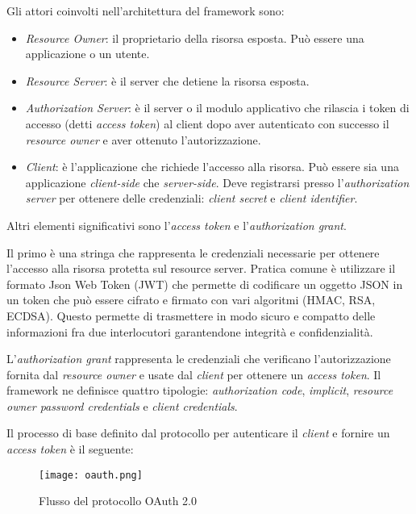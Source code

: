 Gli attori coinvolti nell'architettura del framework sono:
\begin{itemize}
    \item \textit{Resource Owner}: il proprietario della risorsa esposta. Può essere una applicazione o un utente.
    \item \textit{Resource Server}: è il server che detiene la risorsa esposta.
    \item \textit{Authorization Server}: è il server o il modulo applicativo che rilascia i token di accesso (detti \textit{access token}) al client dopo aver
          autenticato con successo il \textit{resource owner} e aver ottenuto l'autorizzazione.
    \item  \textit{Client}: è l'applicazione che richiede l'accesso alla risorsa. Può essere sia una applicazione \textit{client-side} che \textit{server-side}.
          Deve registrarsi presso l'\textit{authorization server} per ottenere delle credenziali: \textit{client secret} e \textit{client identifier}.
\end{itemize}

Altri elementi significativi sono l'\textit{access token} e l'\textit{authorization grant}.

Il primo è una stringa che rappresenta le credenziali necessarie per ottenere l'accesso alla risorsa protetta sul resource server.
Pratica comune è utilizzare il formato Json Web Token\cite{rfc7519} (JWT) che permette di codificare un oggetto JSON in un token
che può essere cifrato e firmato con vari algoritmi (HMAC, RSA, ECDSA). Questo permette di trasmettere in modo sicuro e compatto delle informazioni
fra due interlocutori garantendone integrità e confidenzialità.

L'\textit{authorization grant} rappresenta le credenziali che verificano l'autorizzazione fornita dal \textit{resource owner} e usate dal \textit{client} per ottenere un \textit{access token}.
Il framework ne definisce quattro tipologie: \textit{authorization code}, \textit{implicit}, \textit{resource owner password credentials} e \textit{client credentials}.

Il processo di base definito dal protocollo per autenticare il \textit{client} e fornire un \textit{access token} è il seguente:
\begin{figure}[h]
    \centering
    \texttt{[image: oauth.png]}
    \caption{Flusso del protocollo OAuth 2.0}
    \label{fig:OAuth2.0}
\end{figure}

